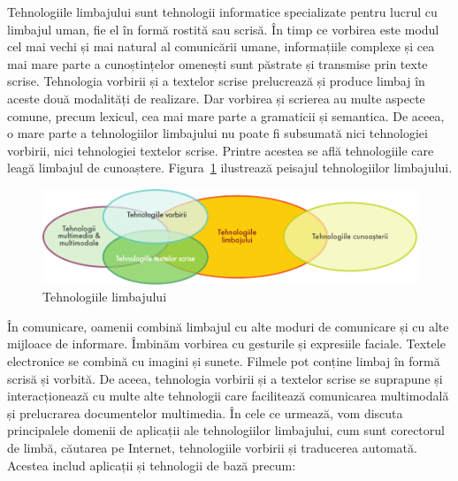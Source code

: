 \clearpage

\begin{multicols}{2}

Tehnologiile limbajului sunt tehnologii informatice specializate pentru lucrul cu limbajul uman, fie el în formă rostită sau scrisă. În timp ce vorbirea este modul cel mai vechi și mai natural al comunicării umane, informațiile complexe și cea mai mare parte a cunoștințelor omenești sunt păstrate și transmise prin texte scrise. Tehnologia vorbirii și a textelor scrise prelucrează și produce limbaj în aceste două modalități de realizare. Dar vorbirea și scrierea au multe aspecte comune, precum lexicul, cea mai mare parte a gramaticii și semantica. De aceea, o mare parte a tehnologiilor limbajului nu poate fi subsumată nici tehnologiei vorbirii, nici tehnologiei textelor scrise. Printre acestea se află tehnologiile care leagă limbajul de cunoaștere. Figura~\ref{fig:ltincontext_de} ilustrează peisajul tehnologiilor limbajului.

\begin{figure}[htb]
\center
\includegraphics[width=\textwidth]{../_media/romanian/language_technologies}
\caption{Tehnologiile limbajului}
\label{fig:ltincontext_de}
\end{figure}

În comunicare, oamenii combină limbajul cu alte moduri de comunicare și cu alte mijloace de informare. Îmbinăm vorbirea cu gesturile și expresiile faciale. Textele electronice se combină cu imagini și sunete. Filmele pot conține limbaj în formă scrisă și vorbită. De aceea, tehnologia vorbirii și a textelor scrise se suprapune și interacționează cu multe alte tehnologii care facilitează comunicarea multimodală și prelucrarea documentelor multimedia.
În cele ce urmează, vom discuta principalele domenii de aplicații ale tehnologiilor limbajului, cum sunt corectorul de limbă, căutarea pe Internet, tehnologiile vorbirii și traducerea automată. Acestea includ aplicații și tehnologii de bază precum:


\end{multicols}
